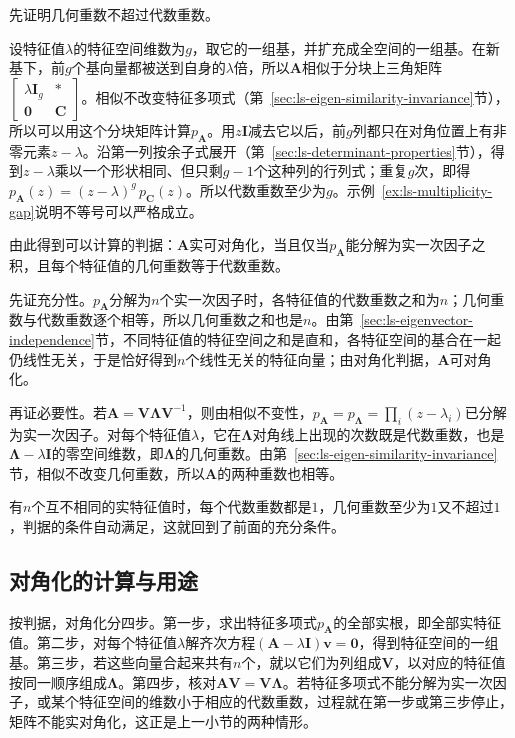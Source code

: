 先证明几何重数不超过代数重数。

设特征值$\lambda$的特征空间维数为$g$，取它的一组基，并扩充成全空间的一组基。在新基下，前$g$个基向量都被送到自身的$\lambda$倍，所以$\bm A$相似于分块上三角矩阵$\left[\begin{smallmatrix}\lambda\bm I_g&*\\\bm0&\bm C\end{smallmatrix}\right]$。相似不改变特征多项式（第~\ref{sec:ls-eigen-similarity-invariance}节），所以可以用这个分块矩阵计算$p_{\bm A}$。用$z\bm I$减去它以后，前$g$列都只在对角位置上有非零元素$z-\lambda$。沿第一列按余子式展开（第~\ref{sec:ls-determinant-properties}节），得到$z-\lambda$乘以一个形状相同、但只剩$g-1$个这种列的行列式；重复$g$次，即得$p_{\bm A}(z)=(z-\lambda)^g\,p_{\bm C}(z)$。所以代数重数至少为$g$。示例~\ref{ex:ls-multiplicity-gap}说明不等号可以严格成立。

由此得到可以计算的判据：$\bm A$实可对角化，当且仅当$p_{\bm A}$能分解为实一次因子之积，且每个特征值的几何重数等于代数重数。

先证充分性。$p_{\bm A}$分解为$n$个实一次因子时，各特征值的代数重数之和为$n$；几何重数与代数重数逐个相等，所以几何重数之和也是$n$。由第~\ref{sec:ls-eigenvector-independence}节，不同特征值的特征空间之和是直和，各特征空间的基合在一起仍线性无关，于是恰好得到$n$个线性无关的特征向量；由对角化判据，$\bm A$可对角化。

再证必要性。若$\bm A=\bm V\bm\Lambda\bm V^{-1}$，则由相似不变性，$p_{\bm A}=p_{\bm\Lambda}=\prod_i(z-\lambda_i)$已分解为实一次因子。对每个特征值$\lambda$，它在$\bm\Lambda$对角线上出现的次数既是代数重数，也是$\bm\Lambda-\lambda\bm I$的零空间维数，即$\bm\Lambda$的几何重数。由第~\ref{sec:ls-eigen-similarity-invariance}节，相似不改变几何重数，所以$\bm A$的两种重数也相等。

有$n$个互不相同的实特征值时，每个代数重数都是$1$，几何重数至少为$1$又不超过$1$，判据的条件自动满足，这就回到了前面的充分条件。

\subsection{对角化的计算与用途}

按判据，对角化分四步。第一步，求出特征多项式$p_{\bm A}$的全部实根，即全部实特征值。第二步，对每个特征值$\lambda$解齐次方程$(\bm A-\lambda\bm I)\bm v=\bm0$，得到特征空间的一组基。第三步，若这些向量合起来共有$n$个，就以它们为列组成$\bm V$，以对应的特征值按同一顺序组成$\bm\Lambda$。第四步，核对$\bm A\bm V=\bm V\bm\Lambda$。若特征多项式不能分解为实一次因子，或某个特征空间的维数小于相应的代数重数，过程就在第一步或第三步停止，矩阵不能实对角化，这正是上一小节的两种情形。

